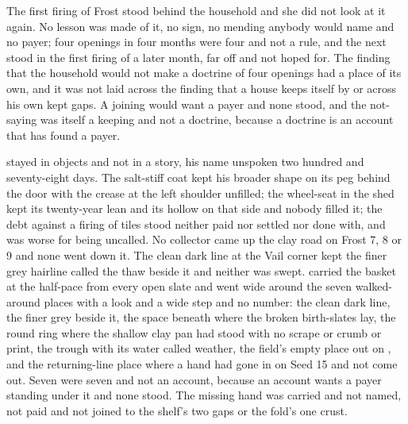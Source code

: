 The first firing of Frost stood behind the household and she did not look at it again. No lesson was made of it, no sign, no mending anybody would name and no payer; four openings in four months were four and not a rule, and the next stood in the first firing of a later month, far off and not hoped for. The finding that the household would not make a doctrine of four openings had a place of its own, and it was not laid across the finding that a house keeps itself by  or across his own kept gaps. A joining would want a payer and none stood, and the not-saying was itself a keeping and not a doctrine, because a doctrine is an account that has found a payer.

 stayed in objects and not in a story, his name unspoken two hundred and seventy-eight days. The salt-stiff coat kept his broader shape on its peg behind the door with the crease at the left shoulder unfilled; the wheel-seat in the shed kept its twenty-year lean and its hollow on that side and nobody filled it; the debt against a firing of tiles stood neither paid nor settled nor done with, and was worse for being uncalled. No collector came up the clay road on Frost 7, 8 or 9 and none went down it. The clean dark line at the Vail corner kept the finer grey hairline called the thaw beside it and neither was swept.  carried the basket at the half-pace from every open slate and went wide around the seven walked-around places with a look and a wide step and no number: the clean dark line, the finer grey beside it, the space beneath  where the broken birth-slates lay, the round ring where the shallow clay pan had stood with no scrape or crumb or print, the trough with its water called weather, the field's empty place out on , and the returning-line place where a hand had gone in on Seed 15 and not come out. Seven were seven and not an account, because an account wants a payer standing under it and none stood. The missing hand was carried and not named, not paid and not joined to the shelf's two gaps or the fold's one crust.

